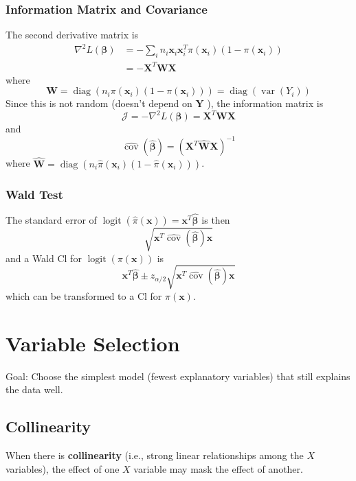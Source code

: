 \documentclass[11pt]{elegantbook}
\begin{document}
\subsubsection*{Information Matrix and Covariance}
The second derivative matrix is
$$
\begin{aligned}
\nabla^2 L(\boldsymbol{\beta}) & =-\sum_i n_i \boldsymbol{x}_i \boldsymbol{x}_i^T \pi\left(\boldsymbol{x}_i\right)\left(1-\pi\left(\boldsymbol{x}_i\right)\right) \\
& =-\boldsymbol{X}^T \boldsymbol{W} \boldsymbol{X}
\end{aligned}
$$
where
$$
\boldsymbol{W}=\operatorname{diag}\left(n_i \pi\left(\boldsymbol{x}_i\right)\left(1-\pi\left(\boldsymbol{x}_i\right)\right)\right)=\operatorname{diag}\left(\operatorname{var}\left(Y_i\right)\right)
$$
Since this is not random (doesn't depend on $\boldsymbol{Y}$ ), the information matrix is
$$
\mathcal{J}=-\nabla^2 L(\boldsymbol{\beta})=\boldsymbol{X}^T \boldsymbol{W} \boldsymbol{X}
$$
and
$$
\widehat{\operatorname{cov}}(\hat{\boldsymbol{\beta}})=\left(\boldsymbol{X}^T \hat{\boldsymbol{W}} \boldsymbol{X}\right)^{-1}
$$
where $\hat{\boldsymbol{W}}=\operatorname{diag}\left(n_i \hat{\pi}\left(\boldsymbol{x}_i\right)\left(1-\hat{\pi}\left(\boldsymbol{x}_i\right)\right)\right)$.


\subsubsection*{Wald Test}
The standard error of $\operatorname{logit}(\hat{\pi}(\boldsymbol{x}))=\boldsymbol{x}^T \hat{\boldsymbol{\beta}}$ is then
$$
\sqrt{\boldsymbol{x}^T \widehat{\operatorname{cov}}(\hat{\boldsymbol{\beta}}) \boldsymbol{x}}
$$
and a Wald Cl for $\operatorname{logit}(\pi(\boldsymbol{x}))$ is
$$
\boldsymbol{x}^T \hat{\boldsymbol{\beta}} \pm z_{\alpha / 2} \sqrt{\boldsymbol{x}^T \widehat{\operatorname{cov}}(\hat{\boldsymbol{\beta}}) \boldsymbol{x}}
$$
which can be transformed to a $\mathrm{Cl}$ for $\pi(\boldsymbol{x})$.


\section{Variable Selection}
Goal: Choose the simplest model (fewest explanatory variables) that still explains the data well.

\subsection{ Collinearity}
When there is \textbf{collinearity} (i.e., strong linear relationships among the $X$ variables), the effect of one $X$ variable may mask the effect of another.
\end{document}
